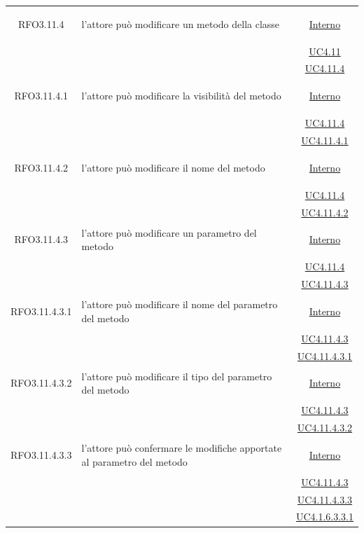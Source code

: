 \begin{itemize}
\begin{itemize}
\begin{itemize}
\begin{itemize}
\begin{longtable}{|c|>{\centering}m{7cm}|c|}
\hypertarget{RFO3.11.4}{RFO3.11.4} & l'attore può modificare un metodo della classe &  \hyperlink{Interno}{Interno}\\
& &\hyperref[UC4.11]{UC4.11}\\
& &\hyperref[UC4.11.4]{UC4.11.4}\\ \hline

\hypertarget{RFO3.11.4.1}{RFO3.11.4.1} & l'attore può modificare la visibilità del metodo &  \hyperlink{Interno}{Interno}\\
& &\hyperref[UC4.11.4]{UC4.11.4}\\
& &\hyperref[UC4.11.4.1]{UC4.11.4.1}\\ \hline

\hypertarget{RFO3.11.4.2}{RFO3.11.4.2} & l'attore può modificare il nome del metodo &  \hyperlink{Interno}{Interno}\\
& &\hyperref[UC4.11.4]{UC4.11.4}\\
& &\hyperref[UC4.11.4.2]{UC4.11.4.2}\\ \hline

\hypertarget{RFO3.11.4.3}{RFO3.11.4.3} & l'attore può modificare un parametro del metodo &  \hyperlink{Interno}{Interno}\\
& &\hyperref[UC4.11.4]{UC4.11.4}\\
& &\hyperref[UC4.11.4.3]{UC4.11.4.3}\\ \hline

\hypertarget{RFO3.11.4.3.1}{RFO3.11.4.3.1} & l'attore può modificare il nome del parametro del metodo &  \hyperlink{Interno}{Interno}\\
& &\hyperref[UC4.11.4.3]{UC4.11.4.3}\\
& &\hyperref[UC4.11.4.3.1]{UC4.11.4.3.1}\\ \hline

\hypertarget{RFO3.11.4.3.2}{RFO3.11.4.3.2} & l'attore può modificare il tipo del parametro del metodo &  \hyperlink{Interno}{Interno}\\
& &\hyperref[UC4.11.4.3]{UC4.11.4.3}\\
& &\hyperref[UC4.11.4.3.2]{UC4.11.4.3.2}\\ \hline

\hypertarget{RFO3.11.4.3.3}{RFO3.11.4.3.3} & l'attore può confermare le modifiche apportate al parametro del metodo &  \hyperlink{Interno}{Interno}\\
& &\hyperref[UC4.11.4.3]{UC4.11.4.3}\\
& &\hyperref[UC4.11.4.3.3]{UC4.11.4.3.3}\\
& &\hyperref[UC4.1.6.3.3.1]{UC4.1.6.3.3.1}\\ \hline


\end{longtable}
\end{itemize}
\end{itemize}
\end{itemize}
\end{itemize}
